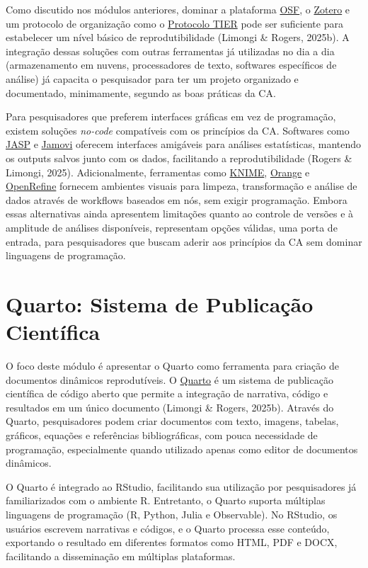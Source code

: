 \documentclass[
  a4paper,
]{book}
\begin{document}
Como discutido nos módulos anteriores, dominar a plataforma
\href{https://osf.io/}{OSF}, o \href{https://www.zotero.org/}{Zotero} e
um protocolo de organização como o
\href{https://www.projecttier.org/tier-protocol/protocol-4-0/}{Protocolo
TIER} pode ser suficiente para estabelecer um nível básico de
reprodutibilidade (Limongi \& Rogers, 2025b). A integração dessas
soluções com outras ferramentas já utilizadas no dia a dia
(armazenamento em nuvens, processadores de texto, softwares específicos
de análise) já capacita o pesquisador para ter um projeto organizado e
documentado, minimamente, segundo as boas práticas da CA.

Para pesquisadores que preferem interfaces gráficas em vez de
programação, existem soluções \emph{no-code} compatíveis com os
princípios da CA. Softwares como \href{https://jasp-stats.org/}{JASP} e
\href{https://www.jamovi.org/}{Jamovi} oferecem interfaces amigáveis
para análises estatísticas, mantendo os outputs salvos junto com os
dados, facilitando a reprodutibilidade (Rogers \& Limongi, 2025).
Adicionalmente, ferramentas como \href{https://www.knime.com/}{KNIME},
\href{https://orangedatamining.com/}{Orange} e
\href{https://openrefine.org/}{OpenRefine} fornecem ambientes visuais
para limpeza, transformação e análise de dados através de workflows
baseados em nós, sem exigir programação. Embora essas alternativas ainda
apresentem limitações quanto ao controle de versões e à amplitude de
análises disponíveis, representam opções válidas, uma porta de entrada,
para pesquisadores que buscam aderir aos princípios da CA sem dominar
linguagens de programação.

\section{Quarto: Sistema de Publicação
Científica}\label{quarto-sistema-de-publicauxe7uxe3o-cientuxedfica}

O foco deste módulo é apresentar o Quarto como ferramenta para criação
de documentos dinâmicos reprodutíveis. O
\href{https://quarto.org/}{Quarto} é um sistema de publicação científica
de código aberto que permite a integração de narrativa, código e
resultados em um único documento (Limongi \& Rogers, 2025b). Através do
Quarto, pesquisadores podem criar documentos com texto, imagens,
tabelas, gráficos, equações e referências bibliográficas, com pouca
necessidade de programação, especialmente quando utilizado apenas como
editor de documentos dinâmicos.

O Quarto é integrado ao RStudio, facilitando sua utilização por
pesquisadores já familiarizados com o ambiente R. Entretanto, o Quarto
suporta múltiplas linguagens de programação (R, Python, Julia e
Observable). No RStudio, os usuários escrevem narrativas e códigos, e o
Quarto processa esse conteúdo, exportando o resultado em diferentes
formatos como HTML, PDF e DOCX, facilitando a disseminação em múltiplas
plataformas.
\end{document}
